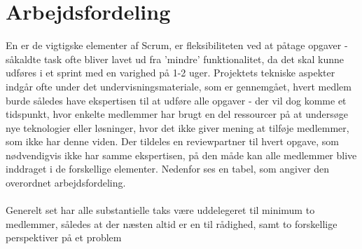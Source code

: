 \documentclass[a4paper,12pt,fleqn,oneside]{article}
\begin{document}
\section{Arbejdsfordeling}
En er de vigtigske elementer af Scrum, er fleksibiliteten ved at påtage opgaver - såkaldte task ofte bliver lavet ud fra 'mindre' funktionalitet, da det skal kunne udføres i et sprint med en varighed på 1-2 uger. Projektets tekniske aspekter indgår ofte under det undervisningsmateriale, som er gennemgået, hvert medlem burde således have ekspertisen til at udføre alle opgaver - der vil dog komme et tidspunkt, hvor enkelte medlemmer har brugt en del ressourcer på at undersøge nye teknologier eller løsninger, hvor det ikke giver mening at tilføje medlemmer, som ikke har denne viden. Der tildeles en reviewpartner til hvert opgave, som nødvendigvis ikke har samme ekspertisen, på den måde kan alle medlemmer blive inddraget i de forskellige elementer. Nedenfor ses en tabel, som angiver den overordnet arbejdsfordeling. \\\\
Generelt set har alle substantielle taks være uddelegeret til minimum to medlemmer, således at der næsten altid er en til rådighed, samt to forskellige perspektiver på et problem 
\end{document}
